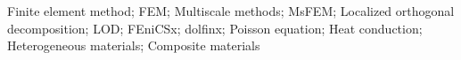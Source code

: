 \documentclass[zavrsnirad]{fer}
\begin{document}
\begin{keywords}
  \frenchspacing
  Finite element method; FEM; Multiscale methods; MsFEM; Localized orthogonal decomposition; LOD;
  FEniCSx; dolfinx; Poisson equation; Heat conduction; Heterogeneous materials; Composite materials
  \nonfrenchspacing
\end{keywords}



\backmatter


% 
\end{document}
